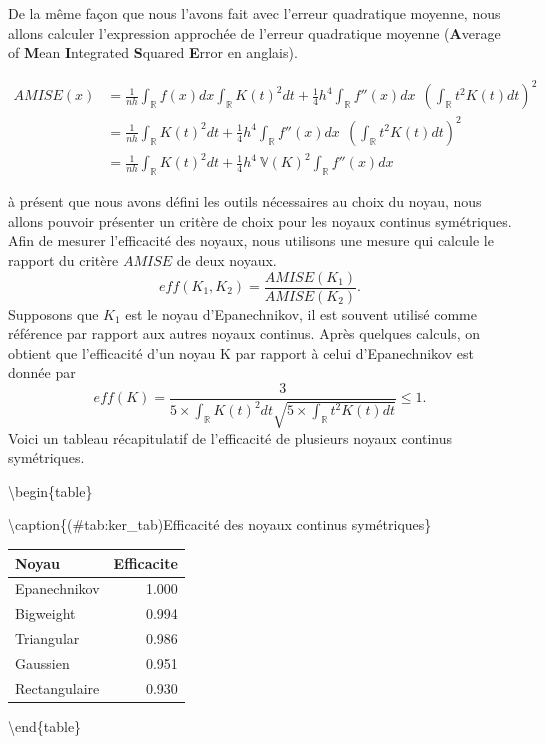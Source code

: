 \documentclass[
]{book}
\begin{document}
De la même façon que nous l'avons fait avec l'erreur quadratique moyenne, nous allons calculer l'expression approchée de l'erreur quadratique moyenne (\textbf{A}verage of \textbf{M}ean \textbf{I}ntegrated \textbf{S}quared \textbf{E}rror en anglais).

\[
\begin{aligned}
AMISE(x)&= \frac1{nh} \int_{\mathbb R}f(x)dx \int_{\mathbb R}K(t)^2 dt + \frac14h^4 \int_{\mathbb R}f''(x)dx ~~\left(\int_{\mathbb R} t^2K(t) dt \right)^2\\
&= \frac1{nh} \int_{\mathbb R}K(t)^2 dt 
+ \frac14h^4 \int_{\mathbb R}f''(x)dx ~~\left(\int_{\mathbb R} t^2K(t) dt \right)^2\\
&= \frac1{nh} \int_{\mathbb R}K(t)^2 dt 
+ \frac14h^4 ~ \mathbb V (K)^2 \int_{\mathbb R}f''(x)dx 
\end{aligned}
\]

\hspace*{0.5cm} à présent que nous avons défini les outils nécessaires au choix du noyau, nous allons pouvoir présenter un critère de choix pour les noyaux continus symétriques. Afin de mesurer l'efficacité des noyaux, nous utilisons une mesure qui calcule le rapport du critère \(AMISE\) de deux noyaux.
\[
eff(K_1,K_2) = \frac{AMISE(K_1)}{AMISE(K_2)}.
\]
Supposons que \(K_1\) est le noyau d'Epanechnikov, il est souvent utilisé comme référence par rapport aux autres noyaux continus. Après quelques calculs, on obtient que l'efficacité d'un noyau K par rapport à celui d'Epanechnikov est donnée par
\[
eff(K) = \frac{3}{5\times \int_{\mathbb R}K(t)^2 dt\sqrt{5 \times\int_{\mathbb R}t^2K(t) dt} } \leq1.
\]
Voici un tableau récapitulatif de l'efficacité de plusieurs noyaux continus symétriques.

\textbackslash begin\{table\}

\textbackslash caption\{(\#tab:ker\_tab)Efficacité des noyaux continus symétriques\}
\centering

\begin{tabular}[t]{lr}
\toprule
Noyau & Efficacite\\
\midrule
Epanechnikov & 1.000\\
Bigweight & 0.994\\
Triangular & 0.986\\
Gaussien & 0.951\\
Rectangulaire & 0.930\\
\bottomrule
\end{tabular}

\textbackslash end\{table\}
\end{document}
